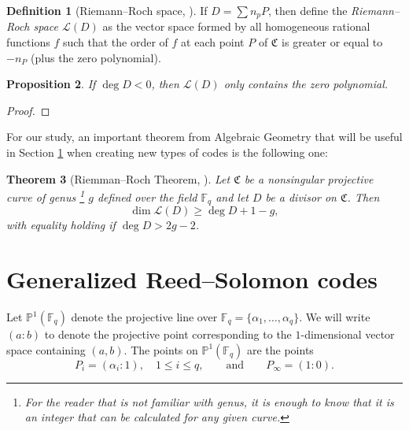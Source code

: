 \documentclass[11pt, oneside]{amsart}
\newtheorem{thm}{Theorem}[section]
\newtheorem{prop}[thm]{Proposition}
\theoremstyle{definition}
\newtheorem{defn}[thm]{Definition}
\theoremstyle{remark}
\numberwithin{equation}{section}
\begin{document}
\begin{defn}[Riemann--Roch space, \cite{LS87}]
	If $D = \sum n_p P$, then define the \emph{Riemann--Roch space $\mathcal L(D)$} as the vector space formed by all homogeneous rational functions $f$ such that the order of $f$ at each point $P$ of $\mathfrak C$ is greater or equal to $-n_P$ (plus the zero polynomial).
\end{defn}

\begin{prop}\label{prop:degDlt0}
	If $\deg D < 0$, then $\mathcal L(D)$ only contains the zero polynomial.
\end{prop}

\begin{proof}
\end{proof}

For our study, an important theorem from Algebraic Geometry that will be useful in Section \ref{s:grs} when creating new types of codes is the following one:
\begin{thm}[Riemman--Roch Theorem, \cite{Wal00}]
	Let $\mathfrak C$ be a nonsingular projective curve of genus%
	\footnote{For the reader that is not familiar with genus, it is enough to know that it is an integer that can be calculated for any given curve.}
	$g$ defined over the field $\mathbb{F}_q$ and let $D$ be a divisor on $\mathfrak C$.
	Then
	\begin{equation}
		\dim \mathcal L(D) \ge \deg D + 1 - g,
	\end{equation}
	with equality holding if $\deg D > 2g - 2$.
\end{thm}


\section{Generalized Reed--Solomon codes} \label{s:grs}
Let $\mathbb{P}^1(\mathbb{F}_q)$ denote the projective line over $\mathbb{F}_q = \{\alpha_1, \dots, \alpha_q\}$.
We will write $(a : b)$ to denote the projective point corresponding to the $1$-dimensional vector space containing $(a, b)$.
The points on $\mathbb{P}^1(\mathbb{F}_q)$ are the points
\begin{equation}
	P_i = (\alpha_i : 1), \quad 1 \le i \le q, \qquad \text{and} \qquad 
	P_\infty = (1 : 0).
\end{equation}
\end{document}
